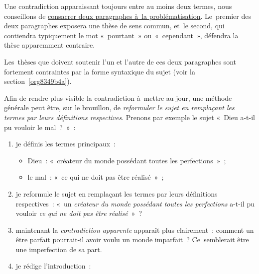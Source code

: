 \documentclass[a4paper,12pt]{report}
\begin{document}
Une contradiction apparaissant toujours entre au moins deux termes, nous
conseillons de \uline{consacrer deux paragraphes à la problématisation}.
Le premier des deux paragraphes exposera une thèse de sens commun, et le
second, qui contiendra typiquement le mot « pourtant » ou « cependant »,
défendra la thèse apparemment contraire.

Les thèses que doivent soutenir l'un et l'autre de ces deux paragraphes
sont fortement contraintes par la forme syntaxique du sujet (voir la
section \ref{org8349b4a}).

Afin de rendre plus visible la contradiction à mettre au jour, une
méthode générale peut être, sur le brouillon, de \emph{reformuler le sujet en
remplaçant les termes par leurs définitions respectives}. Prenons par
exemple le sujet « Dieu a-t-il pu vouloir le mal ? » :

\begin{enumerate}
\item je définis les termes principaux :
\begin{itemize}
\item Dieu : « créateur du monde possédant toutes les perfections » ;
\item le mal : « ce qui ne doit pas être réalisé » ;
\end{itemize}

\item je reformule le sujet en remplaçant les termes par leurs définitions
respectives : « un \emph{créateur du monde possédant toutes les
perfections} a-t-il pu vouloir \emph{ce qui ne doit pas être réalisé} » ?

\item maintenant la \emph{contradiction apparente} apparaît plus clairement :
comment un être parfait pourrait-il avoir voulu un monde imparfait ?
Ce semblerait être une imperfection de sa part.

\item je rédige l'introduction :
\end{enumerate}
\end{document}
